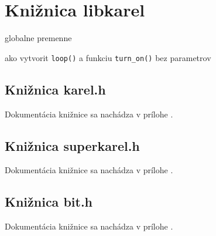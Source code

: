 
\chapter{Knižnica libkarel}\label{ch:libkarel}



globalne premenne

ako vytvorit \texttt{loop()} a funkciu \texttt{turn\_on()} bez parametrov



\section{Knižnica karel.h}

Dokumentácia knižnice sa nachádza v prílohe .


\section{Knižnica superkarel.h}

Dokumentácia knižnice sa nachádza v prílohe .


\section{Knižnica bit.h}

Dokumentácia knižnice sa nachádza v prílohe .



